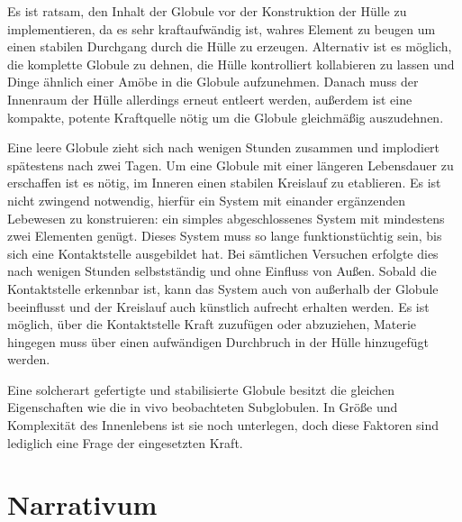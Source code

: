 \documentclass[a5paper,8pt]{book}
\begin{document}
Es ist ratsam, den Inhalt der Globule vor der Konstruktion der Hülle zu implementieren, da es sehr kraftaufwändig ist, 
wahres Element zu beugen um einen stabilen Durchgang durch die Hülle zu erzeugen. Alternativ ist es möglich, die komplette 
Globule zu dehnen, die Hülle  kontrolliert kollabieren zu lassen und Dinge ähnlich einer Amöbe in die Globule aufzunehmen.
Danach muss der Innenraum der Hülle allerdings erneut entleert werden, außerdem ist eine kompakte, potente Kraftquelle 
nötig um die Globule gleichmäßig auszudehnen. 

Eine leere Globule zieht sich nach wenigen Stunden zusammen und implodiert spätestens nach zwei Tagen. Um eine Globule mit 
einer längeren Lebensdauer zu erschaffen ist es nötig, im Inneren einen stabilen Kreislauf zu etablieren. Es ist nicht 
zwingend notwendig, hierfür ein System mit einander ergänzenden Lebewesen zu konstruieren: ein simples abgeschlossenes 
System mit mindestens zwei Elementen genügt. Dieses System muss so lange funktionstüchtig sein, bis sich eine Kontaktstelle 
ausgebildet hat. Bei sämtlichen Versuchen erfolgte dies nach wenigen Stunden selbstständig und ohne Einfluss von Außen. 
Sobald die Kontaktstelle erkennbar ist, kann das System auch von außerhalb der Globule beeinflusst und der Kreislauf auch 
künstlich aufrecht erhalten werden. Es ist möglich, über die Kontaktstelle Kraft zuzufügen oder abzuziehen, Materie 
hingegen muss über einen aufwändigen Durchbruch in der Hülle hinzugefügt werden.

Eine solcherart gefertigte und stabilisierte Globule besitzt die gleichen Eigenschaften wie die in vivo beobachteten 
Subglobulen. In Größe und Komplexität des Innenlebens ist sie noch unterlegen, doch diese Faktoren sind lediglich eine 
Frage der eingesetzten Kraft. 

\newpage

\section{Narrativum}
\end{document}
